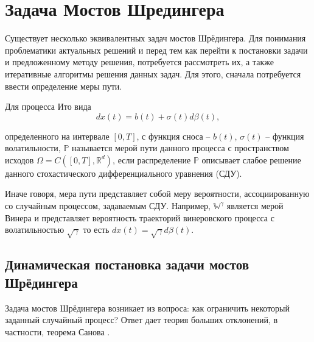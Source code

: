\section{Задача Мостов Шредингера}
\label{sec:Chapter1} 
Существует несколько эквивалентных задач мостов Шрёдингера. Для понимания проблематики актуальных решений и перед тем как перейти к постановки задачи и предложенному методу решения, потребуется рассмотреть их, а также итеративные алгоритмы решения данных задач. Для этого, сначала потребуется ввести определение меры пути.

\begin{definition}
    Для процесса Ито вида 
    \begin{equation*}
        dx(t) = b(t) + \sigma(t)d\beta(t),
    \end{equation*}

    определенного на интервале $[0, T]$, с функция сноса -- $b(t)$, $\sigma(t)$ -- функция волатильности, $\mathbb{P}$ называется мерой пути данного процесса с пространством исходов $\Omega = C([0, T], \mathbb{R}^d)$, если распределение $\mathbb{P}$ описывает слабое решение данного стохастического дифференциального уравнения (СДУ).
\end{definition}

Иначе говоря, мера пути представляет собой меру вероятности, ассоциированную со случайным процессом, задаваемым СДУ. Например, $\mathbb{W}^\gamma$ является мерой Винера и представляет вероятность траекторий винеровского процесса с волатильностью $\sqrt{\gamma}$ то есть $dx(t) = \sqrt{\gamma}d\beta(t)$.

\subsection{Динамическая постановка задачи мостов Шрёдингера}
Задача мостов Шрёдингера возникает из вопроса: как ограничить некоторый заданный случайный процесс? Ответ дает теория больших отклонений, в частности, теорема Санова \cite{sanov}.

